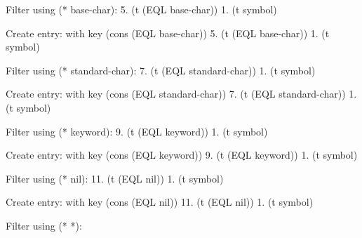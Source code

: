    Filter using (* base-char):
   5.  (t (EQL base-char))
   1.  (t symbol)

   Create entry: with key (cons (EQL base-char))
   5.  (t (EQL base-char))
   1.  (t symbol)

   Filter using (* standard-char):
   7.  (t (EQL standard-char))
   1.  (t symbol)

   Create entry: with key (cons (EQL standard-char))
   7.  (t (EQL standard-char))
   1.  (t symbol)

   Filter using (* keyword):
   9.  (t (EQL keyword))
   1.  (t symbol)

   Create entry: with key (cons (EQL keyword))
   9.  (t (EQL keyword))
   1.  (t symbol)

   Filter using (* nil):
   11. (t (EQL nil))
   1.  (t symbol)

   Create entry: with key (cons (EQL nil))
   11. (t (EQL nil))
   1.  (t symbol)

   Filter using (* *):

